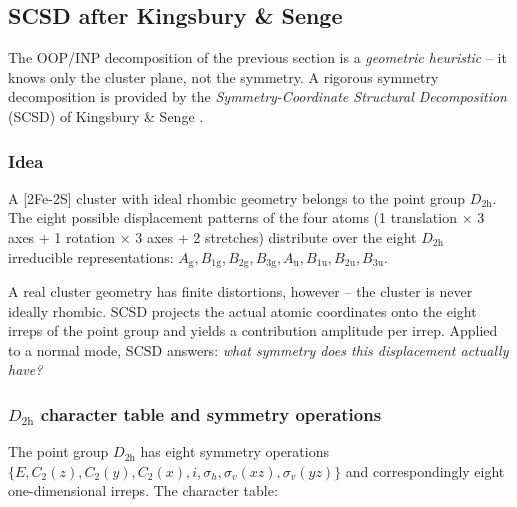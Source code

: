 \documentclass[11pt,a4paper,twoside]{article}
\newcommand{\Ag}{A_{\mathrm{g}}}
\newcommand{\Bgi}[1]{B_{\mathrm{#1g}}}
\newcommand{\Bui}[1]{B_{\mathrm{#1u}}}
\newcommand{\Aui}{A_{\mathrm{u}}}
\theoremstyle{remark}
\begin{document}
\subsection{SCSD after Kingsbury \& Senge}
\label{sec:scsd}

The OOP/INP decomposition of the previous section is a
\emph{geometric heuristic} -- it knows only the cluster plane, not
the symmetry. A rigorous symmetry decomposition is provided by the
\emph{Symmetry-Coordinate Structural Decomposition} (SCSD) of
Kingsbury \& Senge \cite{Kingsbury2024}.

\subsubsection*{Idea}

A {[}2Fe-2S{]} cluster with ideal rhombic geometry belongs to the
point group $D_\mathrm{2h}$. The eight possible displacement
patterns of the four atoms (1 translation $\times$ 3 axes + 1
rotation $\times$ 3 axes + 2 stretches) distribute over the eight
$D_\mathrm{2h}$ irreducible representations:
$\Ag, \Bgi{1}, \Bgi{2}, \Bgi{3}, \Aui, \Bui{1}, \Bui{2}, \Bui{3}$.

A real cluster geometry has finite distortions, however -- the
cluster is never ideally rhombic. SCSD projects the actual atomic
coordinates onto the eight irreps of the point group and yields a
contribution amplitude per irrep. Applied to a normal mode, SCSD
answers: \emph{what symmetry does this displacement actually have?}

\subsubsection*{$D_\mathrm{2h}$ character table and symmetry operations}

The point group $D_\mathrm{2h}$ has eight symmetry operations
$\{E, C_2(z), C_2(y), C_2(x), i, \sigma_h, \sigma_v(xz), \sigma_v(yz)\}$
and correspondingly eight one-dimensional irreps. The character table:
\end{document}
